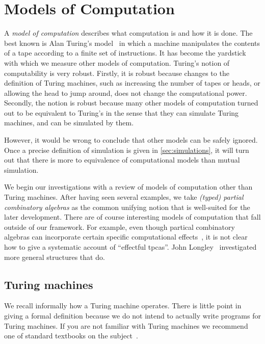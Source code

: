 \chapter{Models of Computation}
\label{cha:models}


A \emph{model of computation} describes what computation is and how it
is done. The best known is Alan Turing's
model~ in which a
machine manipulates the contents of a tape according to a finite set
of instructions. It has become the yardstick with which we measure
other models of computation. Turing's notion of computability is very
robust. Firstly, it is robust because changes to the definition of
Turing machines, such as increasing the number of tapes or heads, or
allowing the head to jump around, does not change the computational
power. Secondly, the notion is robust because many other models of
computation turned out to be equivalent to Turing's in the sense
that they can simulate Turing machines, and can be simulated by them.

However, it would be wrong to conclude that other models can be safely ignored. Once a precise definition of simulation
is given in \cref{sec:simulations}, it will turn out that there is more to equivalence of computational models than mutual simulation.

We begin our investigations with a review of models of computation other than Turing machines. After having seen several examples, we take \emph{(typed) partial combinatory algebras} as the common unifying notion that is well-suited for the later development.
%
There are of course interesting models of computation that fall outside of our framework.
For example, even though partical combinatory algebras can incorporate certain specific computational effects~, it is not clear how to give a systematic account of ``effectful tpcas''. John Longley~ investigated more general structures that do.



\section{Turing machines}
\label{sec:turing-machines}

We recall informally how a Turing machine operates. There is little
point in giving a formal definition because we do not intend to
actually write programs for Turing machines. If you are not familiar
with Turing machines we recommend one of standard textbooks on the
subject~.

